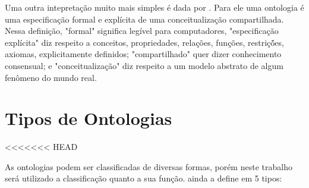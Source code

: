 Uma outra intepretação muito mais simples é dada por 
\cite{borst1997construction}. Para ele uma ontologia é uma especificação formal 
e explícita de uma conceitualização compartilhada. Nessa definição, "formal" 
significa legível para computadores, "especificação explícita" diz respeito a 
conceitos, propriedades, relações, funções, restriçṍes, axiomas, explicitamente 
definidos; "compartilhado" quer dizer conhecimento consensual; e 
"conceitualização" diz respeito a um modelo abstrato de algum fenômeno do mundo 
real.

\section{Tipos de Ontologias}
\label{sec:tipos_de_ontologias}
<<<<<<< HEAD

As ontologias podem ser classificadas de diversas formas, porém neste trabalho
será utilizado a classificação quanto a sua função. \cite{guizzardidesenvolvimento} 
ainda a define em 5 tipos:

